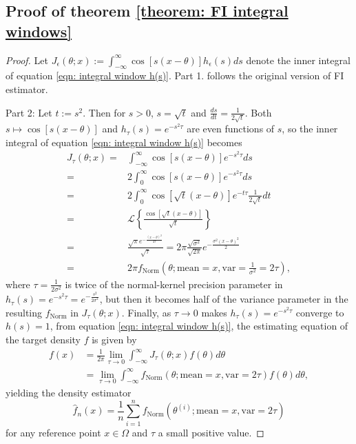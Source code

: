 \documentclass[%
 reprint,
 amsmath,amssymb,
 aps,
]{revtex4-2}
\begin{document}
\subsection{Proof of theorem \ref{theorem: FI integral windows}}
\begin{proof}
    Let $\displaystyle J_\epsilon(\theta; x) := \int_{-\infty}^\infty \cos[s(x-\theta)]h_\epsilon(s)ds$ denote the inner integral of equation \eqref{eqn: integral window h(s)}. Part 1. follows the original version of FI estimator.

    Part 2: Let $t := s^2$. Then for $s > 0$, $s = \sqrt{t}$ and $\frac{ds}{dt} = \frac{1}{2\sqrt{t}}$. Both $s \mapsto \cos[s(x - \theta)]$ and $\displaystyle h_\tau(s) = e^{-s^2\tau}$ are even functions of $s$, so the inner integral of equation \eqref{eqn: integral window h(s)} becomes
    \begin{align*}
        J_\tau(\theta; x) = & \int_{-\infty}^\infty \cos[s(x - \theta)]e^{-s^2\tau}ds \\
        = & 2\int_0^\infty \cos[s(x - \theta)]e^{-s^2\tau}ds \\
        = & 2\int_0^\infty \cos[\sqrt{t}(x - \theta)]e^{-t\tau}\frac{1}{2\sqrt{t}}dt \\
        = & \mathcal{L}\left\{\frac{\cos[\sqrt{t}(x - \theta)]}{\sqrt{t}} \right\} \\
        = & \frac{\sqrt{\pi}e^{-\frac{(x - \theta)^2}{4\tau}}}{\sqrt{\tau}} = 2\pi\frac{\sqrt{\sigma^2}}{\sqrt{2\pi}}e^{-\frac{\sigma^2(x - \theta)^2}{2}} \\
        = & 2\pi f_\text{Norm}(\theta; \text{mean} = x, \text{var} = \frac{1}{\sigma^2} = 2\tau),
    \end{align*}
    where $\tau = \frac{1}{2\sigma^2}$ is twice of the normal-kernel precision parameter in $\displaystyle h_\tau(s) = e^{-s^2\tau} = e^{-\frac{s^2}{2\sigma^2}}$, but then it becomes half of the variance parameter in the resulting $f_\text{Norm}$ in $J_\tau(\theta; x)$. Finally, as $\tau \to 0$ makes $\displaystyle h_\tau(s) = e^{-s^2\tau}$ converge to $h(s) = 1$, from equation \eqref{eqn: integral window h(s)}, the estimating equation of the target density $f$ is given by
    \begin{align*}
        f(x) & = \frac{1}{2\pi} \lim_{\tau \to 0} \int_{-\infty}^\infty J_\tau(\theta; x) f(\theta)d\theta \\
        & = \lim_{\tau \to 0} \int_{-\infty}^\infty f_\text{Norm}(\theta; \text{mean} = x, \text{var} = 2\tau) f(\theta)d\theta,
    \end{align*}
    yielding the density estimator
    \begin{equation*}
        \hat{f}_n(x) = \frac{1}{n} \sum_{i = 1}^n f_\text{Norm}(\theta^{(i)}; \text{mean} = x, \text{var} = 2\tau)
    \end{equation*}
    for any reference point $x \in \Omega$ and $\tau$ a small positive value.


\end{proof}
\end{document}
